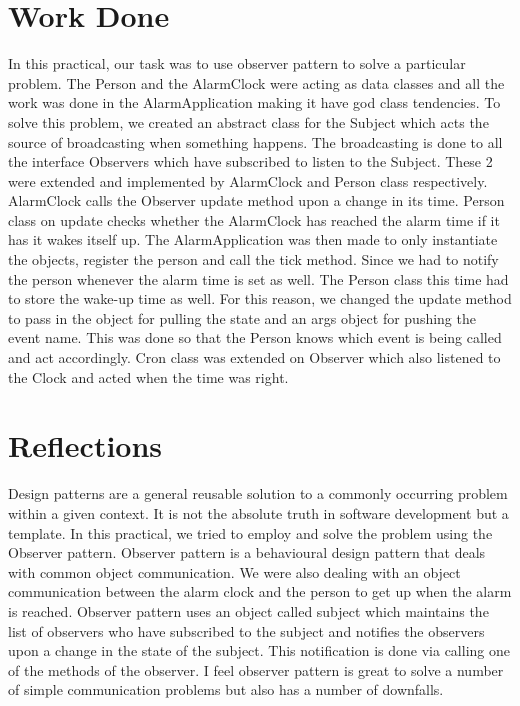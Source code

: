 \section{Work Done}

In this practical, our task was to use observer pattern to solve a particular problem. The Person and the AlarmClock were acting as data classes and all the work was done in the AlarmApplication making it have god class tendencies. To solve this problem, we created an abstract class for the Subject which acts the source of broadcasting when something happens. The broadcasting is done to all the interface Observers which have subscribed to listen to the Subject. These 2 were extended and implemented by AlarmClock and Person class respectively. AlarmClock calls the Observer update method upon a change in its time. Person class on update checks whether the AlarmClock has reached the alarm time if it has it wakes itself up. The AlarmApplication was then made to only instantiate the objects, register the person and call the tick method. Since we had to notify the person whenever the alarm time is set as well. The Person class this time had to store the wake-up time as well. For this reason, we changed the update method to pass in the object for pulling the state and an args object for pushing the event name. This was done so that the Person knows which event is being called and act accordingly. Cron class was extended on Observer which also listened to the Clock and acted when the time was right.

\section{Reflections}

Design patterns are a general reusable solution to a commonly occurring problem within a given context. It is not the absolute truth in software development but a template. In this practical, we tried to employ and solve the problem using the Observer pattern. Observer pattern is a behavioural design pattern that deals with common object communication. We were also dealing with an object communication between the alarm clock and the person to get up when the alarm is reached. Observer pattern uses an object called subject which maintains the list of observers who have subscribed to the subject and notifies the observers upon a change in the state of the subject. This notification is done via calling one of the methods of the observer. I feel observer pattern is great to solve a number of simple communication problems but also has a number of downfalls.

